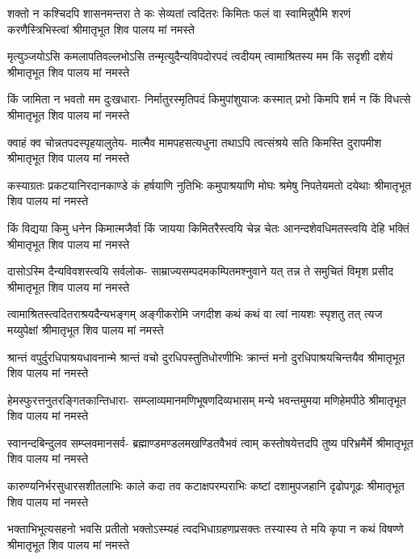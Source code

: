 \fourlineindentedshloka
{शक्तो न कश्चिदपि शासनमन्तरा ते}
{कः सेव्यतां त्वदितरः किमितः फलं वा}
{स्वामिन्नुपैमि शरणं करणैस्त्रिभिस्त्वां}
{श्रीमातृभूत शिव पालय मां नमस्ते} %

\fourlineindentedshloka
{मृत्युञ्जयोऽसि कमलापतिवल्लभोऽसि}
{तन्मृत्युदैन्यविपदोरपदं त्वदीयम्}
{त्वामाश्रितस्य मम किं सदृशी दशेयं}
{श्रीमातृभूत शिव पालय मां नमस्ते} %

\fourlineindentedshloka
{किं जामिता न भवतो मम दुःखधारा-}
{निर्मातुरस्मृतिपदं किमुपांशुयाजः}
{कस्मात् प्रभो किमपि शर्म न किं विधत्से}
{श्रीमातृभूत शिव पालय मां नमस्ते} %

\fourlineindentedshloka
{क्वाहं क्व चोन्नतपदस्पृहयालुतेय-}
{मात्मैव मामपहसत्यधुना तथाऽपि}
{त्वत्संश्रये सति किमस्ति दुरापमीश}
{श्रीमातृभूत शिव पालय मां नमस्ते} %

\fourlineindentedshloka
{कस्याग्रतः प्रकटयानिरदानकाण्डे}
{कं हर्षयाणि नुतिभिः कमुपाश्रयाणि}
{मोघः श्रमेषु निपतेयमतो दयेथाः}
{श्रीमातृभूत शिव पालय मां नमस्ते} %

\fourlineindentedshloka
{किं विद्यया किमु धनेन किमात्मजैर्वा}
{किं जायया किमितरैस्त्वयि चेन्न चेतः}
{आनन्दशेवधिमतस्त्वयि देहि भक्तिं}
{श्रीमातृभूत शिव पालय मां नमस्ते} %

\fourlineindentedshloka
{दासोऽस्मि दैन्यविवशस्त्वयि सर्वलोक-}
{साम्राज्यसम्पदमकम्पितमश्नुवाने}
{यत् तन्न ते समुचितं विमृश प्रसीद}
{श्रीमातृभूत शिव पालय मां नमस्ते} %

\fourlineindentedshloka
{त्वामाश्रितस्त्वदितराश्रयदैन्यभङ्गम्}
{अङ्गीकरोमि जगदीश कथं कथं वा}
{त्वां नायशः स्पृशतु तत् त्यज मय्युपेक्षां}
{श्रीमातृभूत शिव पालय मां नमस्ते} %

\fourlineindentedshloka
{श्रान्तं वपुर्दुरधिपाश्रयधावनान्मे}
{श्रान्तं वचो दुरधिपस्तुतिधोरणीभिः}
{क्रान्तं मनो दुरधिपाश्रयचिन्तयैव}
{श्रीमातृभूत शिव पालय मां नमस्ते} %

\fourlineindentedshloka
{हेमस्फुरत्तनुतरङ्गितकान्तिधारा-}
{सम्प्लाव्यमानमणिभूषणदिव्यभासम्}
{मन्ये भवन्तमुमया मणिहेमपीठे}
{श्रीमातृभूत शिव पालय मां नमस्ते} %

\fourlineindentedshloka
{स्वानन्दबिन्दुलव सम्प्लवमानसर्व-}
{ब्रह्माण्डमण्डलमखण्डितवैभवं त्वाम्}
{कस्तोषयेत्तदपि तुष्य परिभ्रमैर्मे}
{श्रीमातृभूत शिव पालय मां नमस्ते} %

\fourlineindentedshloka
{कारुण्यनिर्भरसुधारसशीतलाभिः}
{काले कदा तव कटाक्षपरम्पराभिः}
{कष्टां दशामुपजहानि दृढोपगूढः}
{श्रीमातृभूत शिव पालय मां नमस्ते} %

\fourlineindentedshloka
{भक्ताभिभूत्यसहनो भवसि प्रतीतो}
{भक्तोऽस्म्यहं त्वदभिधाग्रहणप्रसक्तः}
{तस्यास्य ते मयि कृपा न कथं विषण्णे}
{श्रीमातृभूत शिव पालय मां नमस्ते} %

